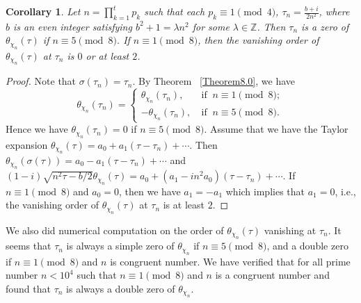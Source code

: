 \documentclass[11pt, reqno]{amsart}
\theoremstyle{plain}
\newtheorem{corollary}[theorem]{Corollary}
\theoremstyle{definition}
\numberwithin{equation}{section}
\begin{document}
\begin{corollary}\label{Corollary8.0}
Let $n=\prod_{k=1}^t p_k$ such that  each $p_k\equiv 1\pmod 4$,  $\tau_n=\frac{b+i}{2n^2}$, where $b$ is an even integer satisfying $b^2+1=\lambda {n^2}$ for some $\lambda\in \mathbb{Z}$.  
Then $\tau_n$ is a zero of $\theta_{\chi_n}(\tau)$ if $n\equiv 5\pmod 8 $.  If $n\equiv 1\pmod 8 $, then the vanishing order 
of  $\theta_{\chi_n}(\tau)$  at $\tau_n$ is $0$ or  at least $2$.  
\end{corollary}
\begin{proof}
Note that $\sigma(\tau_n)=\tau_n$. By Theorem ~\ref{Theorem8.0}, we have 
\[
\theta_{\chi_n}(\tau_n)=\begin{cases}
 \theta_{\chi_n}(\tau_n),&\ \text{if }\ 
n\equiv 1\pmod 8;  \\
-\theta_{\chi_n}(\tau_n),&\ \text{if }\ 
n\equiv 5\pmod 8.
\end{cases}
\]
Hence we have  $\theta_{\chi_n}(\tau_n)=0$ if $n\equiv 5\pmod 8 $.
Assume that  we have  the Taylor expansion $\theta_{\chi_n}(\tau)=a_0+a_1(\tau-\tau_n)+\cdots$. Then 
$\theta_{\chi_n}(\sigma(\tau))=a_0-{a_1}(\tau-\tau_n)+\cdots$ and $ (1-i)\sqrt{n^2\tau-{b}/{2}} \theta_{\chi_n}(\tau) =a_0+(a_1-in^2a_0)(\tau-\tau_n)+\cdots$. 
 If $n\equiv 1\pmod 8 $ and $a_0=0$, then we have $a_1=-a_1$
  which implies that $a_1=0$, i.e., 
  the vanishing order 
of  $\theta_{\chi_n}(\tau)$  at $\tau_n$ is  at least $2$.  
\end{proof}

We also did   numerical computation on the order of $\theta_{\chi_n}(\tau)$ vanishing at $\tau_n$.  It seems that  $\tau_n$ is always a simple zero of $\theta_{\chi_n}$ if $n\equiv 5\pmod 8 $, and a double zero if $n\equiv 1\pmod 8 $ and $n$ is congruent number.    We have verified that for  all prime number $n<10^4$ such that $n\equiv 1\pmod 8$ and $n$ is a congruent number and found that $\tau_n$ is always a double zero of $\theta_{\chi_n}$. 
\end{document}
